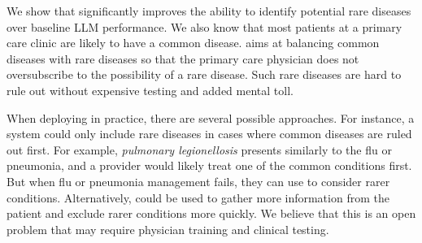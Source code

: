 


We show that \methodname significantly improves the ability to identify potential rare diseases over baseline LLM performance.  We also know that most patients at a primary care clinic are likely to have a common disease.  \methodname aims at balancing common diseases with rare diseases so that the primary care physician does not oversubscribe to the possibility of a rare disease. Such rare diseases are hard to rule out without expensive testing and added mental toll. 


When deploying in practice, there are several possible approaches. For instance, a system could only include rare diseases in cases where common diseases are ruled out first.  For example, \textit{ pulmonary legionellosis} presents similarly to the flu or pneumonia, and a provider would likely treat one of the common conditions first.  But when flu or pneumonia management fails, they can use \methodname to consider rarer conditions.  Alternatively, \methodname could be used to gather more information from the patient and exclude rarer conditions more quickly.
We believe that this is an open problem that may require physician training and clinical testing.


